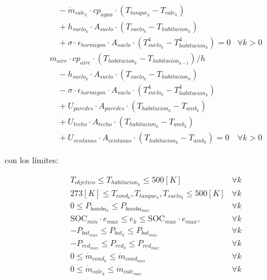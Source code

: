 \begin{align}
	                        & \quad - \dot{m}_{cale_k} \cdot cp_{agua} \cdot (T_{tanque_k} - T_{cale_k})                             \nonumber                               \\
	                        & \quad + h_{suelo_k} \cdot A_{suelo} \cdot (T_{suelo_k} - T_{habitacion_k})                             \nonumber                               \\
	                        & \quad + \sigma \cdot \epsilon_{hormigon} \cdot A_{suelo} \cdot (T_{suelo_k}^4 - T_{habitacion_k}^4) = 0  \label{eq:sys_3_sand} & \forall k > 0 \\
	                        & m_{aire} \cdot cp_{aire} \cdot ( T_{habitacion_k} - T_{habitacion_{k-1}}) / h  \nonumber                                                       \\
	                        & \quad - h_{suelo_k} \cdot A_{suelo} \cdot (T_{suelo_k} - T_{habitacion_k})  \nonumber                                                          \\
	                        & \quad - \sigma \cdot \epsilon_{hormigon} \cdot A_{suelo} \cdot (T_{suelo_k}^4 - T_{habitacion_k}^4)  \nonumber                                 \\
	                        & \quad + U_{paredes} \cdot A_{paredes} \cdot (T_{habitacion_k} - T_{amb_k}) \nonumber                                                           \\
	                        & \quad + U_{techo} \cdot A_{techo} \cdot (T_{habitacion_k} - T_{amb_k}) \nonumber                                                               \\
	                        & \quad + U_{ventanas} \cdot A_{ventanas} \cdot (T_{habitacion_k} - T_{amb_k}) = 0  \label{eq:sys_4_sand}                        & \forall k > 0
\end{align}

con los límites:

\begin{align}
	 & T_{objetivo} \leq T_{habitacion_k} \leq 500[K]  \label{eq:min_t_habitacion_constraint_sand} & \forall k \\
	 & 273[K] \leq T_{cond_k}, T_{tanque_k}, T_{suelo_k} \leq 500[K]                               & \forall k \\
	 & 0 \leq P_{bomba_k} \leq P_{bomba_{max}} \quad                                               & \forall k \\
	 & \text{SOC}_{min} \cdot e_{max} \leq e_k \leq \text{SOC}_{max} \cdot e_{max}, \quad          & \forall k \\
	 & -P_{bat_{max}} \leq P_{bat_k} \leq P_{bat_{max}} \quad                                      & \forall k \\
	 & -P_{red_{max}} \leq P_{red_k} \leq P_{red_{max}} \quad                                      & \forall k \\
	 & 0 \leq \dot{m}_{cond_k} \leq \dot{m}_{cond_{max}} \quad                                     & \forall k \\
	 & 0 \leq \dot{m}_{cale_k} \leq \dot{m}_{cale_{max}} \quad                                     & \forall k
\end{align}

